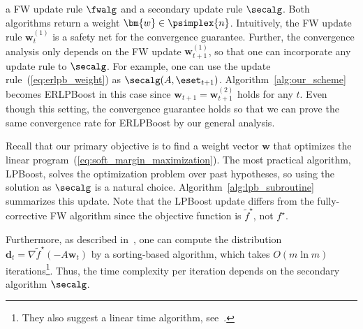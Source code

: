 a FW update rule $\fwalg$ and 
a secondary update rule $\secalg$. 
Both algorithms return a weight $\bm{w} \in \psimplex{n}$. 
Intuitively, the FW update rule $\bm{w}_t^{(1)}$ is 
a safety net for the convergence guarantee. 
Further, the convergence analysis only depends on 
the FW update $\bm{w}_{t+1}^{(1)}$, 
so that one can incorporate any update rule to $\secalg$. 
For example, one can use the update rule~(\ref{eq:erlpb_weight}) 
as $\secalg(A, \eset_{t+1})$. 
Algorithm~\ref{alg:our_scheme} becomes 
ERLPBoost in this case 
since $\bm{w}_{t+1} = \bm{w}_{t+1}^{(2)}$ holds for any $t$. 
Even though this setting, the convergence guarantee holds 
so that we can prove the same convergence rate for ERLPBoost 
by our general analysis. 

Recall that our primary objective is to find a weight vector $\bm{w}$ 
that optimizes the linear program~(\ref{eq:soft_margin_maximization}). 
The most practical algorithm, LPBoost, 
solves the optimization problem over past hypotheses, 
so using the solution as $\secalg$ is a natural choice. 
Algorithm~\ref{alg:lpb_subroutine} summarizes this update. 
Note that the LPBoost update 
differs from the fully-corrective FW algorithm 
since the objective function is $\tilde{f}^\star$, not $f^\star$. 

Furthermore, as described in~\citep{shalev-shwartz+:jml10}, 
one can compute the distribution 
$\bm{d}_t = \nabla \tilde{f}^\star (-A \bm{w}_t)$ 
by a sorting-based algorithm, 
which takes $O(m \ln m)$ iterations\footnote{%
They also suggest a linear time algorithm, %
see~\citep{herbster+:jmlr01}. %
}. 
Thus, the time complexity per iteration depends on 
the secondary algorithm $\secalg$. 


